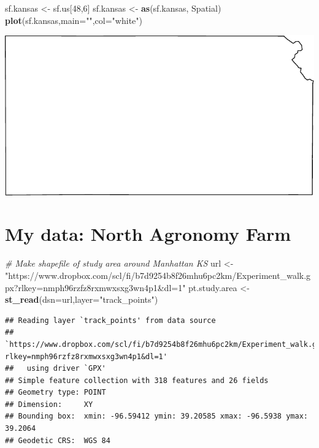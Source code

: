 \documentclass[
]{book}
\newenvironment{Shaded}{\begin{snugshade}}{\end{snugshade}}
\newcommand{\AttributeTok}[1]{\textcolor[rgb]{0.13,0.29,0.53}{#1}}
\newcommand{\CommentTok}[1]{\textcolor[rgb]{0.56,0.35,0.01}{\textit{#1}}}
\newcommand{\DecValTok}[1]{\textcolor[rgb]{0.00,0.00,0.81}{#1}}
\newcommand{\FunctionTok}[1]{\textcolor[rgb]{0.13,0.29,0.53}{\textbf{#1}}}
\newcommand{\NormalTok}[1]{#1}
\newcommand{\OtherTok}[1]{\textcolor[rgb]{0.56,0.35,0.01}{#1}}
\newcommand{\StringTok}[1]{\textcolor[rgb]{0.31,0.60,0.02}{#1}}
\begin{document}
\begin{Shaded}
\begin{Highlighting}[]
\NormalTok{sf.kansas }\OtherTok{\textless{}{-}}\NormalTok{ sf.us[}\DecValTok{48}\NormalTok{,}\DecValTok{6}\NormalTok{]}
\NormalTok{sf.kansas }\OtherTok{\textless{}{-}} \FunctionTok{as}\NormalTok{(sf.kansas, }\StringTok{\textquotesingle{}Spatial\textquotesingle{}}\NormalTok{)}
\FunctionTok{plot}\NormalTok{(sf.kansas,}\AttributeTok{main=}\StringTok{""}\NormalTok{,}\AttributeTok{col=}\StringTok{"white"}\NormalTok{)}
\end{Highlighting}
\end{Shaded}

\includegraphics{_main_files/figure-latex/unnamed-chunk-12-1.pdf}

\hypertarget{my-data-north-agronomy-farm}{%
\section{My data: North Agronomy Farm}\label{my-data-north-agronomy-farm}}

\begin{Shaded}
\begin{Highlighting}[]
\CommentTok{\# Make shapefile of study area around Manhattan KS}
\NormalTok{url }\OtherTok{\textless{}{-}} \StringTok{"https://www.dropbox.com/scl/fi/b7d9254b8f26mhu6pc2km/Experiment\_walk.gpx?rlkey=nmph96rzfz8rxmwxsxg3wn4p1\&dl=1"}
\NormalTok{pt.study.area }\OtherTok{\textless{}{-}} \FunctionTok{st\_read}\NormalTok{(}\AttributeTok{dsn=}\NormalTok{url,}\AttributeTok{layer=}\StringTok{"track\_points"}\NormalTok{)}
\end{Highlighting}
\end{Shaded}

\begin{verbatim}
## Reading layer `track_points' from data source 
##   `https://www.dropbox.com/scl/fi/b7d9254b8f26mhu6pc2km/Experiment_walk.gpx?rlkey=nmph96rzfz8rxmwxsxg3wn4p1&dl=1' 
##   using driver `GPX'
## Simple feature collection with 318 features and 26 fields
## Geometry type: POINT
## Dimension:     XY
## Bounding box:  xmin: -96.59412 ymin: 39.20585 xmax: -96.5938 ymax: 39.2064
## Geodetic CRS:  WGS 84
\end{verbatim}
\end{document}
